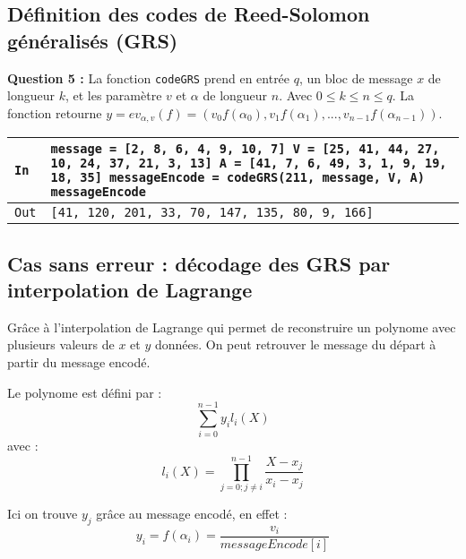 \documentclass[titlepage]{article}
\begin{document}
        \subsection{Définition des codes de Reed-Solomon généralisés (GRS)}

        \textbf{Question 5 :}
        La fonction \texttt{codeGRS} prend en entrée $q$, un bloc de message $x$ de longueur $k$, et les paramètre $v$ et $\alpha$ de longueur $n$.
        Avec $0 \leqslant k \leqslant n \leqslant q$. La fonction retourne $y = ev_{\alpha,v}(f) = (v_0f(\alpha_0), v_1f(\alpha_1), ..., v_{n-1}f(\alpha_{n-1}))$.

        

        \begin{tabularx}{12cm}{|p{0.60cm}|X|}
            \hline
            \rowcolor{gray}
            \texttt{In}
            & 
            \texttt{message = [2, 8, 6, 4, 9, 10, 7] \newline
            V = [25, 41, 44, 27, 10, 24, 37, 21, 3, 13] \newline
A =         [41, 7, 6, 49, 3, 1, 9, 19, 18, 35] \newline
            messageEncode = codeGRS(211, message, V, A) \newline
            messageEncode}
            \\
            \hline
            \texttt{Out}
            &
            \texttt{[41, 120, 201, 33, 70, 147, 135, 80, 9, 166]}
            \\
            \hline
        \end{tabularx}
        \bigbreak

        \subsection{Cas sans erreur : décodage des GRS par interpolation de Lagrange}
        Grâce à l'interpolation de Lagrange qui permet de reconstruire un polynome avec plusieurs valeurs de $x$ et $y$ données. 
        On peut retrouver le message du départ à partir du message encodé.

        Le polynome est défini par :
        \[\sum_{i=0}^{n-1}y_il_i(X)\]
        avec :
        \[l_i(X) = \prod_{j = 0; j \neq i}^{n - 1}\frac{X-x_j}{x_i-x_j} \]

        Ici on trouve $y_j$ grâce au message encodé, en effet : 
        \[y_i = f(\alpha_i) = \frac{v_i}{messageEncode[i]}\]
\end{document}
